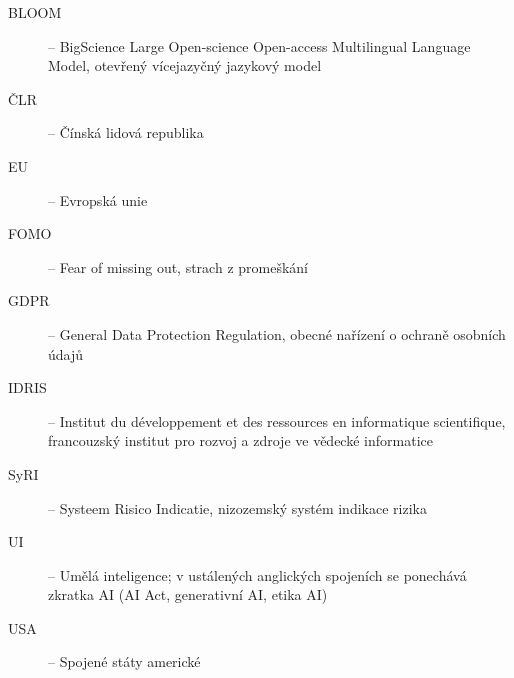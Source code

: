 \clearpage

{}

\vskip 20pt

\begin{description}
\item[BLOOM] -- BigScience Large Open-science Open-access Multilingual Language Model, otevřený vícejazyčný jazykový model
\item[ČLR] -- Čínská lidová republika
\item[EU] -- Evropská unie
\item[FOMO] -- Fear of missing out, strach z promeškání
\item[GDPR] -- General Data Protection Regulation, obecné nařízení o ochraně osobních údajů
\item[IDRIS] -- Institut du développement et des ressources en informatique scientifique, francouzský institut pro rozvoj a zdroje ve vědecké informatice
\item[SyRI] -- Systeem Risico Indicatie, nizozemský systém indikace rizika
\item[UI] -- Umělá inteligence; v ustálených anglických spojeních se ponechává zkratka AI (AI Act, generativní AI, etika AI)
\item[USA] -- Spojené státy americké
\end{description}
